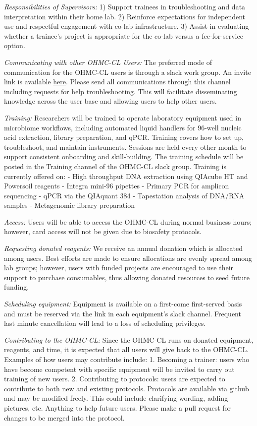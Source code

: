 \documentclass[
]{book}
\begin{document}
\emph{Responsibilities of Supervisors:}
1) Support trainees in troubleshooting and data interpretation within their home lab.
2) Reinforce expectations for independent use and respectful engagement with co-lab infrastructure.
3) Assist in evaluating whether a trainee's project is appropriate for the co-lab versus a fee-for-service
option.

\emph{Communicating with other OHMC-CL Users:} The preferred mode of communication for the OHMC-CL users is through a slack work group. An invite link is available \href{}{here}. Please send all communications through this channel including requests for help troubleshooting. This will facilitate disseminating knowledge across the user base and allowing users to help other users.

\emph{Training:} Researchers will be trained to operate laboratory equipment used in microbiome workflows, including automated liquid handlers for 96-well nucleic acid extraction, library preparation, and qPCR. Training covers how to set up, troubleshoot, and maintain instruments. Sessions are held every other month to support consistent onboarding and skill-building. The training schedule will be posted in the Training channel of the OHMC-CL slack group. Training is currently offered on:
- High throughput DNA extraction using QIAcube HT and Powersoil reagents
- Integra mini-96 pipettes
- Primary PCR for amplicon sequencing
- qPCR via the QIAquant 384
- Tapestation analysis of DNA/RNA samples
- Metagenomic library preparation

\emph{Access:} Users will be able to access the OHMC-CL during normal business hours; however, card access will not be given due to biosafety protocols.

\emph{Requesting donated reagents:} We receive an annual donation which is allocated among users. Best efforts are made to ensure allocations are evenly spread among lab groups; however, users with funded projects are encouraged to use their support to purchase consumables, thus allowing donated resources to seed future funding.

\emph{Scheduling equipment:} Equipment is available on a first-come first-served basis and must be reserved via the link in each equipment's slack channel. Frequent last minute cancellation will lead to a loss of scheduling privileges.

\emph{Contributing to the OHMC-CL:} Since the OHMC-CL runs on donated equipment, reagents, and time, it is expected that all users will give back to the OHMC-CL. Examples of how users may contribute include:
1. Becoming a trainer: users who have become competent with specific equipment will be invited to carry out training of new users.
2. Contributing to protocols: users are expected to contribute to both new and existing protocols. Protocols are available via github and may be modified freely. This could include clarifying wording, adding pictures, etc. Anything to help future users. Please make a pull request for changes to be merged into the protocol.
\end{document}
